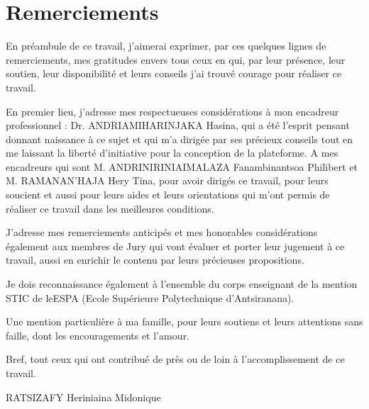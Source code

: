\chapter*{Remerciements}


{\setlength{\baselineskip}{1.5\baselineskip}


En préambule de ce travail, j'aimerai exprimer, par ces quelques lignes de remerciements,
mes gratitudes envers tous ceux en qui, par leur présence, leur soutien, leur disponibilité
et leurs conseils j'ai trouvé courage pour réaliser ce travail.
\bigskip

En premier lieu, j'adresse mes respectueuses considérations à mon encadreur
professionnel : Dr. ANDRIAMIHARINJAKA Hasina, qui a été l'esprit pensant donnant
naissance à ce sujet et qui m'a dirigée par ses précieux conseils tout en me laissant la
liberté d'initiative pour la conception de la plateforme. A mes encadreurs qui sont M.
ANDRINIRINIAIMALAZA Fanambinantsoa Philibert et M. RAMANAN'HAJA Hery Tina,
pour avoir dirigés ce travail, pour leurs soucient et aussi pour leurs aides et leurs
orientations qui m'ont permis de réaliser ce travail dans les meilleures conditions.
\bigskip

J'adresse mes remerciements anticipés et mes honorables considérations également aux
membres de Jury qui vont évaluer et porter leur jugement à ce travail, aussi en enrichir le
contenu par leurs précieuses propositions.
\bigskip

Je dois reconnaissance également à l'ensemble du corps enseignant de la mention STIC
de leESPA (Ecole Supérieure Polytechnique d'Antsiranana).
\bigskip

Une mention particulière à ma famille, pour leurs soutiens et leurs attentions sans faille,
dont les encouragements et l'amour.
\bigskip

Bref, tout ceux qui ont contribué de près ou de loin à l'accomplissement de ce travail.

\null\hfill RATSIZAFY Heriniaina Midonique


\par}


